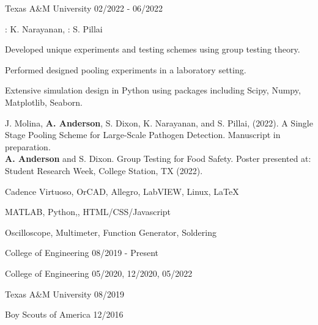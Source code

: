 \documentclass[11pt]{article}
\begin{document}
\begin{description}
\squish
{}
            {Texas A\&M University}
            {02/2022 - 06/2022}

\underline{}: K. Narayanan, \underline{}: S. Pillai

\textbullet \space Developed unique experiments and testing schemes using group testing theory.

\textbullet \space Performed designed pooling experiments in a laboratory setting.

\textbullet \space Extensive simulation design in Python using packages including Scipy, Numpy, Matplotlib, Seaborn.

\end{description}


J. Molina, \textbf{A. Anderson}, S. Dixon, K. Narayanan, and S. Pillai, (2022). A Single Stage Pooling Scheme for Large-Scale Pathogen Detection. Manuscript in preparation. \\

\textbf{A. Anderson} and S. Dixon. Group Testing for Food Safety. Poster presented at: Student Research Week, College Station, TX (2022).
\\


      {Cadence Virtuoso, OrCAD, Allegro, LabVIEW, Linux, \LaTeX}

      {MATLAB, Python,\CPP, HTML/CSS/Javascript}

      {Oscilloscope, Multimeter, Function Generator, Soldering}


\bigskip




\begin{description}
\squish
{}
           {College of Engineering}
           {08/2019 - Present}

           {College of Engineering}
           {05/2020, 12/2020, 05/2022}

           {Texas A\&M University}
           {08/2019}

           {Boy Scouts of America}
           {12/2016}

\end{description}
\end{document}
